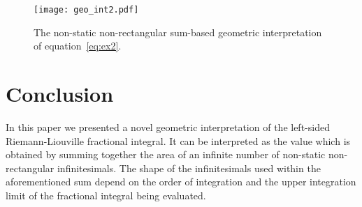 \documentclass[twoside,reqno,11pt]{fcaa-var} %
\begin{document}
\begin{figure}[htb]
\centering
\texttt{[image: geo\_int2.pdf]}
\caption{The non-static non-rectangular sum-based geometric interpretation of equation~\eqref{eq:ex2}.}
\label{fig:geo2}
\end{figure}

\section{Conclusion}
\noindent
In this paper we presented a novel geometric interpretation of the left-sided 
Riemann-Liouville fractional integral. It can be interpreted as the value which is 
obtained by summing together the area of an infinite number of non-static non-rectangular infinitesimals. The shape of the infinitesimals used within the aforementioned sum depend on the order of integration and the upper integration limit of the fractional integral being evaluated.





\end{document}
